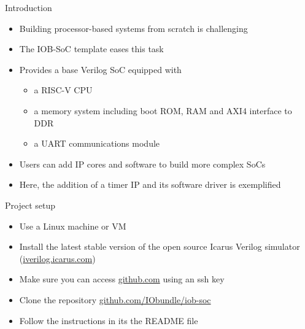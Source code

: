 \documentclass [xcolor=svgnames, t] {beamer}
\begin{document}
\begin{frame}{Introduction}
\begin{center}
    \begin{itemize}
      \item Building processor-based systems from scratch is challenging
      \item The IOB-SoC template eases this task
      \item Provides a base Verilog SoC equipped with
        \begin{itemize}
        \item a RISC-V CPU
        \item a memory system including boot ROM, RAM and AXI4 interface to DDR
        \item a UART communications module
        \end{itemize}
      \item Users can add IP cores and software to build more complex SoCs
      \item Here, the addition of a timer IP and its software driver is exemplified
    \end{itemize}
\end{center}
\end{frame}

\begin{frame}{Project setup}
\begin{center}
  \begin{itemize}
    \item Use a Linux machine or VM
    \item Install the latest stable version of the open source Icarus Verilog simulator (\url{iverilog.icarus.com})
    \item Make sure you can access \url{github.com} using an ssh key
    \item Clone the repository \url{github.com/IObundle/iob-soc}
    \item Follow the instructions in its the README file
  \end{itemize}
\end{center}
\end{frame}
\end{document}

